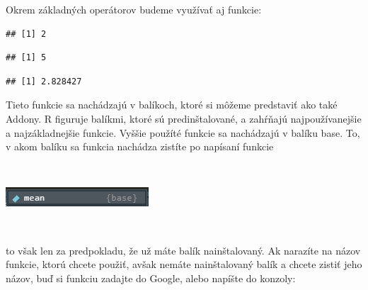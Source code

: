 Okrem základných operátorov budeme využívať aj funkcie:

\begin{Shaded}
\begin{Highlighting}[]
\NormalTok{(}\NormalTok{, }\NormalTok{, }\NormalTok{)}
\end{Highlighting}
\end{Shaded}

\begin{verbatim}
## [1] 2
\end{verbatim}

\begin{Shaded}
\begin{Highlighting}[]
\NormalTok{(}\OperatorTok{-}\NormalTok{)}
\end{Highlighting}
\end{Shaded}

\begin{verbatim}
## [1] 5
\end{verbatim}

\begin{Shaded}
\begin{Highlighting}[]
\NormalTok{(}\NormalTok{)}
\end{Highlighting}
\end{Shaded}

\begin{verbatim}
## [1] 2.828427
\end{verbatim}

Tieto funkcie sa nachádzajú v balíkoch, ktoré si môžeme predstaviť ako
také Addony. R figuruje balíkmi, ktoré sú predinštalované, a zahŕňajú
najpoužívanejšie a najzákladnejšie funkcie. Vyššie použíté funkcie sa
nachádzajú v balíku base. To, v akom balíku sa funkcia nachádza zistíte
po napísaní funkcie

~

\begin{center}

\includegraphics{diplomka obrazky/1.png}

\end{center}

~

to však len za predpokladu, že už máte balík nainštalovaný. Ak narazíte
na názov funkcie, ktorú chcete použiť, avšak nemáte nainštalovaný balík
a chcete zistiť jeho názov, buď si funkciu zadajte do Google, alebo
napíšte do konzoly:

